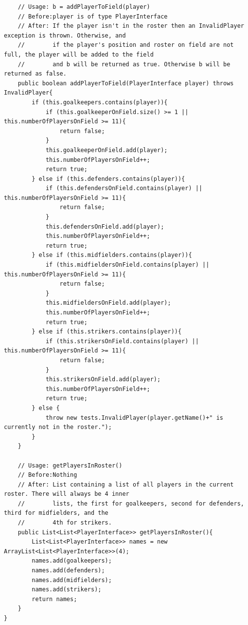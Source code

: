 \documentclass{article}
\begin{document}
\begin{lstlisting}
	// Usage: b = addPlayerToField(player)
	// Before:player is of type PlayerInterface
	// After: If the player isn't in the roster then an InvalidPlayer exception is thrown. Otherwise, and
	//        if the player's position and roster on field are not full, the player will be added to the field
	//        and b will be returned as true. Otherwise b will be returned as false.
	public boolean addPlayerToField(PlayerInterface player) throws InvalidPlayer{
		if (this.goalkeepers.contains(player)){
			if (this.goalkeeperOnField.size() >= 1 || this.numberOfPlayersOnField >= 11){
				return false;
			}
			this.goalkeeperOnField.add(player);
			this.numberOfPlayersOnField++;
			return true;
		} else if (this.defenders.contains(player)){
			if (this.defendersOnField.contains(player) || this.numberOfPlayersOnField >= 11){
				return false;
			}
			this.defendersOnField.add(player);
			this.numberOfPlayersOnField++;
			return true;
		} else if (this.midfielders.contains(player)){
			if (this.midfieldersOnField.contains(player) || this.numberOfPlayersOnField >= 11){
				return false;
			}
			this.midfieldersOnField.add(player);
			this.numberOfPlayersOnField++;
			return true;
		} else if (this.strikers.contains(player)){
			if (this.strikersOnField.contains(player) || this.numberOfPlayersOnField >= 11){
				return false;
			}
			this.strikersOnField.add(player);
			this.numberOfPlayersOnField++;
			return true;
		} else {
			throw new tests.InvalidPlayer(player.getName()+" is currently not in the roster.");
		}
	}
	
	// Usage: getPlayersInRoster()
	// Before:Nothing
	// After: List containing a list of all players in the current roster. There will always be 4 inner
	//        lists, the first for goalkeepers, second for defenders, third for midfielders, and the
	//        4th for strikers.
	public List<List<PlayerInterface>> getPlayersInRoster(){
		List<List<PlayerInterface>> names = new ArrayList<List<PlayerInterface>>(4);
		names.add(goalkeepers);
		names.add(defenders);
		names.add(midfielders);
		names.add(strikers);
		return names;
	}
}
\end{lstlisting}
\end{document}
